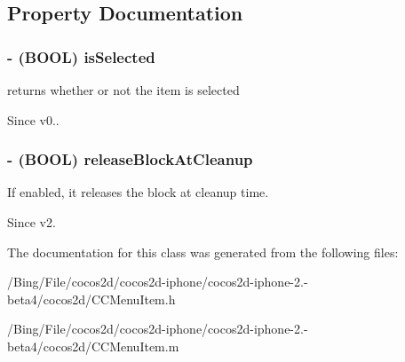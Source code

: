 \subsection{Property Documentation}
\hypertarget{interface_c_c_menu_item_afb5f2156c708a728c74b0a47c489d1a0}{
\subsubsection[{is\-Selected}]{\setlength{\rightskip}{0pt plus 5cm}-\/ (B\-O\-O\-L) {\bf is\-Selected}}}\label{interface_c_c_menu_item_afb5f2156c708a728c74b0a47c489d1a0}
returns whether or not the item is selected \begin{DoxySince}{Since}
v0.. 
\end{DoxySince}
\hypertarget{interface_c_c_menu_item_a988b42590257fa3d9c878be9aeb5e527}{
\subsubsection[{release\-Block\-At\-Cleanup}]{\setlength{\rightskip}{0pt plus 5cm}-\/ (B\-O\-O\-L) {\bf release\-Block\-At\-Cleanup}}}\label{interface_c_c_menu_item_a988b42590257fa3d9c878be9aeb5e527}
If enabled, it releases the block at cleanup time. \begin{DoxySince}{Since}
v2. 
\end{DoxySince}


The documentation for this class was generated from the following files\-:\begin{DoxyCompactItemize}
\item 
/\-Bing/\-File/cocos2d/cocos2d-\/iphone/cocos2d-\/iphone-\/2.-\/beta4/cocos2d/C\-C\-Menu\-Item.\-h\item 
/\-Bing/\-File/cocos2d/cocos2d-\/iphone/cocos2d-\/iphone-\/2.-\/beta4/cocos2d/C\-C\-Menu\-Item.\-m\end{DoxyCompactItemize}
